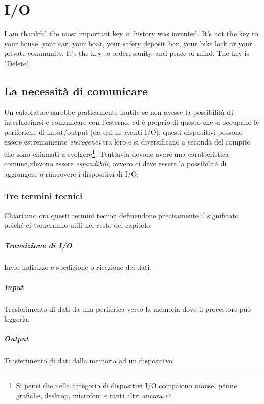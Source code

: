 \documentclass[class=book, crop=false, oneside]{standalone}
\begin{document}
\chapter{I/O}\begin{fquote}I am thankful the most important key in history was invented. It's not the key to your house, your car, your boat, your safety deposit box, your bike lock or your private community. It's the key to order, sanity, and peace of mind. The key is "Delete".
 \end{fquote}

\section{La necessità di comunicare}
Un calcolatore sarebbe praticamente inutile se non avesse la possibilità di interfacciarsi e comunicare con l'esterno, ed è proprio di questo che si occupano le periferiche di input/output (da qui in avanti I/O); questi dispositivi possono essere estremamente \emph{eterogenei} tra loro e si diversificano a seconda del compito che sono chiamati a svolgere\footnote{Si pensi che nella categoria di dispositivi I/O compaiono mouse, penne grafiche, desktop, microfoni e tanti altri ancora.}. Ttuttavia devono avere una caratteristica comune,:devono essere \emph{espandibili}, ovvero ci deve essere la possibilità di aggiungere o rimuovere i dispositivi di I/O.

\subsection*{Tre termini tecnici}
Chiariamo ora questi termini tecnici definendone precisamente il significato poiché ci torneranno utili nel resto del capitolo.
\paragraph{Transizione di I/O} Invio indirizzo e spedizione o ricezione dei dati.
\paragraph{Input} Trasferimento di dati da una periferica verso la memoria dove il processore può leggerla.
\paragraph{Output} Trasferimento di dati dalla memoria ad un dispositivo.
\end{document}
